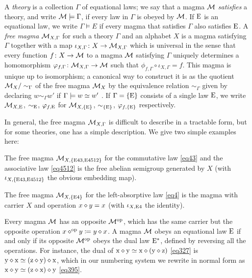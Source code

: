 A \emph{theory} is a collection $\Gamma$ of equational laws; we say that a magma ${\mathcal{M}}$ \emph{satisfies} a theory, and write ${\mathcal{M}} \models \Gamma$, if every law in $\Gamma$ is obeyed by ${\mathcal{M}}$.  If $\mathrm{E}$ is an equational law, we write $\Gamma \models E$ if every magma that satisfies $\Gamma$ also satisfies $\mathrm{E}$. A \emph{free magma} ${\mathcal{M}}_{X,\Gamma}$ for such a theory $\Gamma$ and an alphabet $X$ is a magma satisfying $\Gamma$ together with a map $\iota_{X,\Gamma} \colon X \to {\mathcal{M}}_{X,\Gamma}$ which is universal in the sense that every function $f \colon X \to {\mathcal{M}}$ to a magma ${\mathcal{M}}$ satisfying $\Gamma$ uniquely determines a homomorphism $\varphi_{f,\Gamma} \colon {\mathcal{M}}_{X,\Gamma} \to {\mathcal{M}}$ such that $\phi_{f,\Gamma} \circ \iota_{X,\Gamma} = f$.  This magma is unique up to isomorphism; a canonical way to construct it is as the quotient ${\mathcal{M}}_X/\sim_\Gamma$ of the free magma ${\mathcal{M}}_X$ by the equivalence relation $\sim_\Gamma$ given by declaring $w \sim_\Gamma w'$ if $\Gamma \models w \simeq w'$ \cite[Theorem 3.5.6]{term-rewriting}.  If $\Gamma = \{\mathrm{E}\}$ consists of a single law $\mathrm{E}$, we write ${\mathcal{M}}_{X,\mathrm{E}}$, $\sim_{\mathrm{E}}$, $\varphi_{f,\mathrm{E}}$ for ${\mathcal{M}}_{X,\{\mathrm{E}\}}$, $\sim_{\{\mathrm{E}\}}$, $\varphi_{f,\{\mathrm{E}\}}$ respectively.

In general, the free magma ${\mathcal{M}}_{X,\Gamma}$ is difficult to describe in a tractable form, but for some theories, one has a simple description.  We give two simple examples here:

\begin{example}\label{semi-group} The free magma ${\mathcal{M}}_{X,\{\mathrm{E}43, \mathrm{E}4512\}}$ for the commutative law \eqref{eq43} and the associative law \eqref{eq4512} is the free abelian semigroup generated by $X$ (with $\iota_{X,\{\mathrm{E}43,\mathrm{E}4512\}}$ the obvious embedding map).
\end{example}

\begin{example}\label{left-absorb}
The free magma ${\mathcal{M}}_{X,\{\mathrm{E}4\}}$ for the left-absorptive law \eqref{eq4} is the magma with carrier $X$ and operation $x \diamond y = x$ (with $\iota_{X,\mathrm{E}4}$ the identity).
\end{example}


Every magma ${\mathcal{M}}$ has an opposite ${\mathcal{M}}^{\mathrm{op}}$, which has the same carrier but the opposite operation $x \diamond^{\mathrm{op}} y \coloneqq y \diamond x$.  A magma ${\mathcal{M}}$ obeys an equational law $\mathrm{E}$ if and only if its opposite ${\mathcal{M}}^{\mathrm{op}}$ obeys the dual law $\mathrm{E}^*$, defined by reversing all the operations.  For instance, the dual of
$\mathrm{x} \diamond \mathrm{y} \simeq \mathrm{x} \diamond (\mathrm{y} \diamond \mathrm{z})$ \eqref{eq327} is $\mathrm{y} \diamond \mathrm{x} \simeq (\mathrm{z} \diamond \mathrm{y}) \diamond \mathrm{x}$, which in our numbering system we rewrite in normal form as $\mathrm{x} \diamond \mathrm{y} \simeq (\mathrm{z} \diamond \mathrm{x}) \diamond \mathrm{y}$ \eqref{eq395}.

